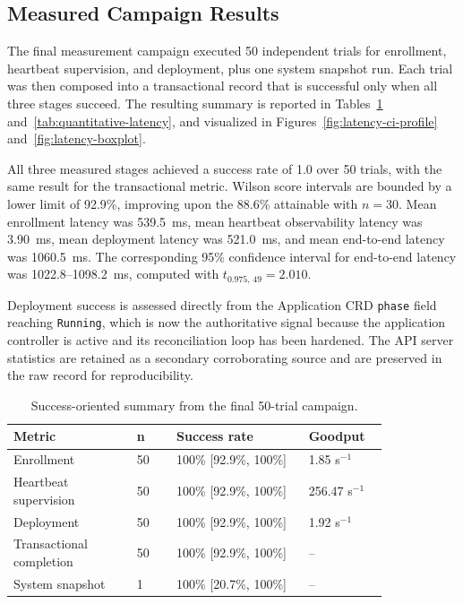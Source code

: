 \subsection{Measured Campaign Results}
The final measurement campaign executed 50 independent trials for enrollment, heartbeat supervision, and deployment, plus one system snapshot run. Each trial was then composed into a transactional record that is successful only when all three stages succeed. The resulting summary is reported in Tables~\ref{tab:quantitative-success} and~\ref{tab:quantitative-latency}, and visualized in Figures~\ref{fig:latency-ci-profile} and~\ref{fig:latency-boxplot}.

All three measured stages achieved a success rate of 1.0 over 50 trials, with the same result for the transactional metric. Wilson score intervals are bounded by a lower limit of 92.9\%, improving upon the 88.6\% attainable with $n=30$. Mean enrollment latency was 539.5~ms, mean heartbeat observability latency was 3.90~ms, mean deployment latency was 521.0~ms, and mean end-to-end latency was 1060.5~ms. The corresponding 95\% confidence interval for end-to-end latency was 1022.8--1098.2~ms, computed with $t_{0.975,\,49}=2.010$.

Deployment success is assessed directly from the Application CRD \texttt{phase} field reaching \texttt{Running}, which is now the authoritative signal because the application controller is active and its reconciliation loop has been hardened. The API server statistics are retained as a secondary corroborating source and are preserved in the raw record for reproducibility.

\begin{table}[h]
\centering
\caption{Success-oriented summary from the final 50-trial campaign.}
\label{tab:quantitative-success}
\begin{tabular}{p{0.28\linewidth} p{0.09\linewidth} p{0.30\linewidth} p{0.16\linewidth}}
\toprule
\textbf{Metric} & \textbf{n} & \textbf{Success rate} & \textbf{Goodput} \\
\midrule
Enrollment & 50 & 100\% [92.9\%, 100\%] & 1.85 s$^{-1}$ \\
Heartbeat supervision & 50 & 100\% [92.9\%, 100\%] & 256.47 s$^{-1}$ \\
Deployment & 50 & 100\% [92.9\%, 100\%] & 1.92 s$^{-1}$ \\
Transactional completion & 50 & 100\% [92.9\%, 100\%] & -- \\
System snapshot & 1 & 100\% [20.7\%, 100\%] & -- \\
\bottomrule
\end{tabular}
\end{table}

